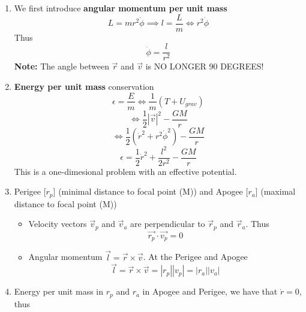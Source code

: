 \documentclass{article}
\newtheorem{one minute paper}[theorem]{One Minute Paper}
\begin{document}
\begin{enumerate}
    \item We first introduce \textbf{angular momentum per unit mass} 
    \begin{equation}
        L = mr^2 \dot{\phi} \implies l = \frac{L}{m} \iff r^2\dot{\phi}
    \end{equation}
    Thus 
    \begin{equation}
        \dot{\phi} = \frac{l}{r^2}
    \end{equation}
    \textbf{Note:} The angle between $\vec{r}$ and $\vec{v}$ is NO LONGER 90 DEGREES!
    \item \textbf{Energy per unit mass} conservation
    \begin{equation}
        \epsilon = \frac{E}{m} \iff \frac{1}{m}(T + U_{grav})
    \end{equation}
    \begin{equation}
        \iff \frac{1}{2}|\vec{v}|^2 - \frac{GM}{r}
    \end{equation}
    \begin{equation}
        \iff \frac{1}{2}(\dot{r}^2 + r^2\dot{\phi}^2) - \frac{GM}{r}
    \end{equation}
    \begin{equation}
        \epsilon = \frac{1}{2}\dot{r}^2 + \frac{l^2}{2r^2} - \frac{GM}{r}
    \end{equation}
    This is a one-dimesional problem with an effective potential.
    \item Perigee [$r_p$] (minimal distance to focal point (M)) and Apogee [$r_a$] (maximal distance to focal point (M))
    \begin{itemize}
        \item Velocity vectors $\vec{v}_p$ and $\vec{v}_a$ are perpendicular to $\vec{r}_p$ and $\vec{r}_a$. Thus
        \begin{equation}
            \vec{r_p} \cdot \vec{v_p} = 0
        \end{equation}
        \item Angular momentum $\vec{l} = \vec{r} \times \vec{v}$. At the Perigee and Apogee
        \begin{equation}
            \vec{l} = \vec{r} \times \vec{v} = |r_p||v_p| = |r_a||v_a|
        \end{equation}
    \end{itemize}
    \item Energy per unit mass in $r_p$ and $r_a$ in Apogee and Perigee, we have that $\dot{r} = 0$, thus 
    \begin{equation}

\end{equation}
\end{enumerate}
\end{document}

